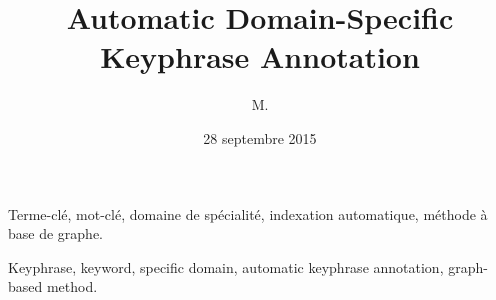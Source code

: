 \documentclass[
  11pt,             %
  french,           %
  greyCover,        %
  fancyChapter,     %
  fancyPart,        %
]{these-LUNAM_mod}
\title{Automatic Domain-Specific Keyphrase Annotation}
\author{M.}{Adrien}{Bougouin}
\date{28 septembre 2015}
\theoremstyle{remark}
\begin{document}
  \begin{resume}\justify\tiny
    
  \end{resume}

  \begin{motscles}\tiny
     Terme-clé, mot-clé, domaine de spécialité, indexation automatique, méthode
     à base de graphe.
  \end{motscles}

  \begin{abstract}\justify\tiny
    
  \end{abstract}

  \begin{keywords}\tiny
     Keyphrase, keyword, specific domain, automatic keyphrase annotation,
     graph-based method.
  \end{keywords}

  \maketitle


%  
%  

  \tableofcontents
  \listoftables
  \listoffigures
  \listofalgorithms

%  
%  
%  
  
  
%  

  \backmatter

  
  

  \printindex
\end{document}
